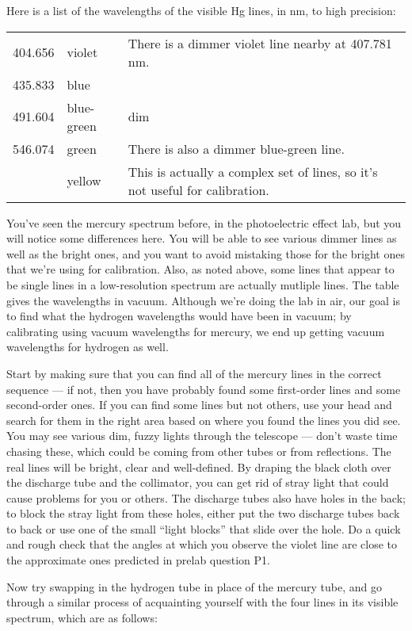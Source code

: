 Here is a list of the wavelengths of the visible Hg lines, in nm, to high precision:

\begin{tabular}{llp{40mm}}
404.656  & violet & There is a dimmer violet line nearby at 407.781 nm.\\
435.833  & blue & \\
491.604  & blue-green & dim \\
546.074  & green & There is also a dimmer blue-green line.\\
           & yellow & This is actually a complex set of lines, so it's not useful for calibration.
\end{tabular}

You've seen the mercury spectrum before, in the photoelectric effect lab, but you will
notice some differences here. You will be able to see various dimmer lines as well as the bright ones,
and you want to avoid mistaking those for the bright ones that we're using for calibration.
Also, as noted above, some lines that appear to be single lines in a low-resolution spectrum 
are actually mutliple lines.
The table gives the wavelengths in vacuum. Although we're doing the lab in air, our goal is to find
what the hydrogen wavelengths would have been in vacuum; by calibrating using vacuum wavelengths
for mercury, we end up getting vacuum wavelengths for hydrogen as well.

Start by making sure
that you can find all of the mercury lines in the correct sequence --- if
not, then you have probably found some first-order
lines and some second-order ones. If you can find some lines
but not others, use your head and search for them in the
right area based on where you found the lines you did see.
You may see various dim, fuzzy lights through the telescope
--- don't waste time chasing these, which could be coming
from other tubes or from reflections. The real lines will be
bright, clear and well-defined. By draping the black cloth over
the discharge tube and the collimator, you can get rid of stray
light that could cause problems for you or others. The discharge tubes also have
holes in the back; to block the stray
light from these holes, either put the two discharge tubes back to back or use one of the small ``light blocks'' that slide over the hole. Do a quick and rough check that the angles at which you observe the violet
line are close to the approximate ones predicted in prelab question P1.

Now try swapping in the hydrogen tube in place of the mercury tube, and go through
a similar process of acquainting yourself with the four lines in its visible spectrum, which are as
follows:

